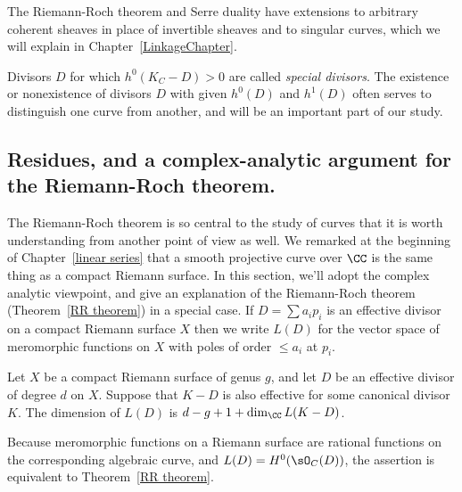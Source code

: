 The Riemann-Roch theorem and Serre duality have extensions to arbitrary coherent sheaves in place of invertible sheaves 
and to singular curves, which we will explain in Chapter~\ref{LinkageChapter}.

Divisors $D$ for which $h^0(K_C - D)>0$ are called \emph{special divisors}. The existence or nonexistence of divisors $D$ with given $h^{0}(D)$ and $h^{1}(D)$ often serves to distinguish one curve from another, and will be an important part of our study.

\subsection{Residues, and a complex-analytic argument for the Riemann-Roch theorem.}\label{RR by residues}
The Riemann-Roch theorem is so central to the study of curves that it is worth understanding from another point
of view as well.
We remarked at the beginning of Chapter~\ref{linear series} that a smooth projective curve over $\CC$ is the same thing as a compact Riemann surface. In this section, we'll adopt the complex analytic viewpoint, and give an explanation of the Riemann-Roch theorem  (Theorem~\ref{RR theorem}) in a special case. 
If $D = \sum a_ip_i$ is an effective divisor 
on a compact Riemann surface $X$ then we write $L(D)$ for the vector space of meromorphic functions on $X$ with poles of order $\leq a_i$ at $p_i$. 

\begin{theorem}
Let $X$ be a compact Riemann surface of genus $g$, and let $D$ be an effective divisor of degree $d$ on $X$. Suppose that $K-D$ is also effective for some canonical divisor $K$.
The dimension of  $L(D)$ is
$d-g+1+\dim_\CC L(K-D)$.
\end{theorem}

Because  meromorphic functions on a Riemann surface are rational functions on the corresponding
algebraic curve, and $L(D) = H^0(\sO_C(D))$, the assertion is equivalent to Theorem~\ref{RR theorem}.

